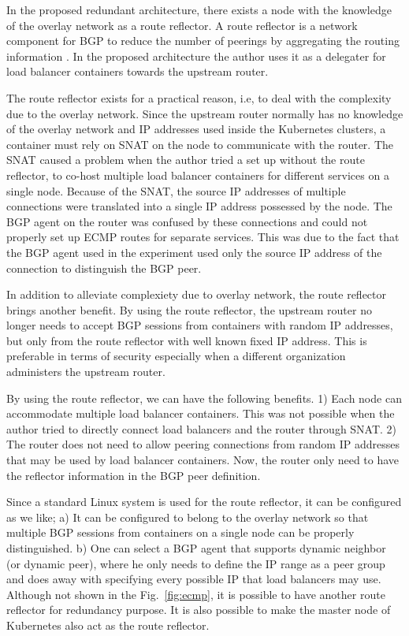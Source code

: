 %
In the proposed redundant architecture, there exists a node with the knowledge of the overlay network as a route reflector.
A route reflector is a network component for BGP to reduce the number of peerings by aggregating the routing information \cite{rfc4456}.
In the proposed architecture the author uses it as a delegater for load balancer containers towards the upstream router.

The route reflector exists for a practical reason, i.e, to deal with the complexity due to the overlay network.
Since the upstream router normally has no knowledge of the overlay network and IP addresses used inside the Kubernetes clusters, a container must rely on SNAT on the node to communicate with the router.
The SNAT caused a problem when the author tried a set up without the route reflector, to co-host multiple load balancer containers for different services on a single node.
Because of the SNAT, the source IP addresses of multiple connections were translated into a single IP address possessed by the node.
The BGP agent on the router was confused by these connections and could not properly set up ECMP routes for separate services.
This was due to the fact that the BGP agent used in the experiment used only the source IP address of the connection to distinguish the BGP peer.

In addition to alleviate complexiety due to overlay network, the route reflector brings another benefit.
By using the route reflector, the upstream router no longer needs to accept BGP sessions from containers with random IP addresses, but only from the route reflector with well known fixed IP address.
This is preferable in terms of security especially when a different organization administers the upstream router.

By using the route reflector, we can have the following benefits.
1) Each node can accommodate multiple load balancer containers. This was not possible when the author tried to directly connect load balancers and the router through SNAT.
2) The router does not need to allow peering connections from random IP addresses that may be used by load balancer containers. Now, the router only need to have the reflector information in the BGP peer definition.

Since a standard Linux system is used for the route reflector, it can be configured as we like;
a) It can be configured to belong to the overlay network so that multiple BGP sessions from containers on a single node can be properly distinguished.
b) One can select a BGP agent that supports dynamic neighbor (or dynamic peer), where he only needs to define the IP range as a peer group and does away with specifying every possible IP that load balancers may use.
Although not shown in the Fig.~\ref{fig:ecmp}, it is possible to have another route reflector for redundancy purpose.
It is also possible to make the master node of Kubernetes also act as the route reflector.

\FloatBarrier



